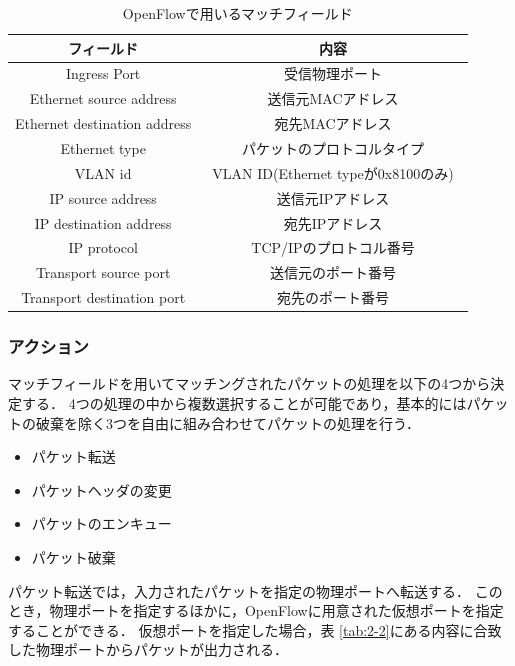 \begin{table}[tb]
	\begin{center}
		\caption{OpenFlowで用いるマッチフィールド}
		\begin{tabular}{c|c}
			\hline \hline
			フィールド & 内容　\\ \hline
			Ingress Port & 受信物理ポート　\\
			Ethernet source address & 送信元MACアドレス \\
			Ethernet destination address & 宛先MACアドレス　\\
			Ethernet type & パケットのプロトコルタイプ \\
			VLAN id & VLAN ID(Ethernet typeが0x8100のみ)　\\
			IP source address & 送信元IPアドレス　\\
			IP destination address & 宛先IPアドレス　\\
			IP protocol & TCP/IPのプロトコル番号　\\
			Transport source port & 送信元のポート番号　\\
			Transport destination port & 宛先のポート番号\\ \hline
		\end{tabular}
		\label{tab:2-1}
	\end{center}
\end{table}

\subsubsection{アクション}

マッチフィールドを用いてマッチングされたパケットの処理を以下の4つから決定する\cite{openflowjapanese}．
4つの処理の中から複数選択することが可能であり，基本的にはパケットの破棄を除く3つを自由に組み合わせてパケットの処理を行う．

\begin{itemize}
	\item パケット転送
	\item パケットヘッダの変更
	\item パケットのエンキュー
	\item パケット破棄
\end{itemize}

パケット転送では，入力されたパケットを指定の物理ポートへ転送する．
このとき，物理ポートを指定するほかに，OpenFlowに用意された仮想ポートを指定することができる．
仮想ポートを指定した場合，表 \ref{tab:2-2}にある内容に合致した物理ポートからパケットが出力される．


